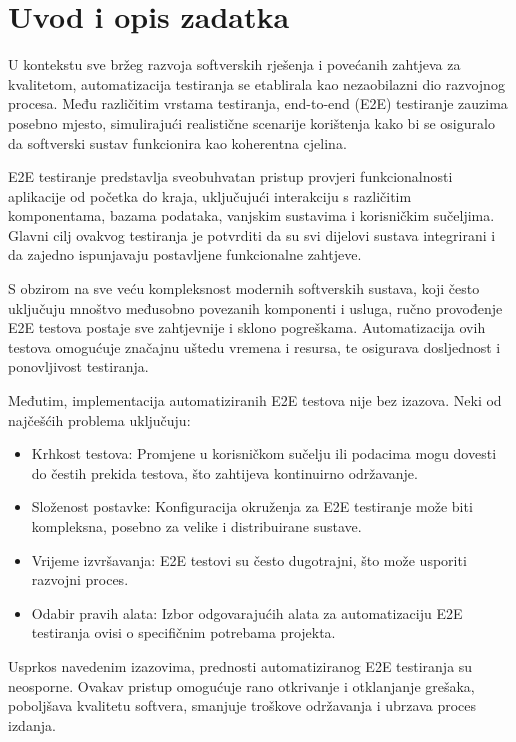 \chapter{Uvod i opis zadatka}\label{OpisIOgranicenja}
U kontekstu sve bržeg razvoja softverskih rješenja i povećanih zahtjeva za kvalitetom, automatizacija testiranja se etablirala kao nezaobilazni dio razvojnog procesa. Među različitim vrstama testiranja, end-to-end (E2E) testiranje zauzima posebno mjesto, simulirajući realistične scenarije korištenja kako bi se osiguralo da softverski sustav funkcionira kao koherentna cjelina.

E2E testiranje predstavlja sveobuhvatan pristup provjeri funkcionalnosti aplikacije od početka do kraja, uključujući interakciju s različitim komponentama, bazama podataka, vanjskim sustavima i korisničkim sučeljima. Glavni cilj ovakvog testiranja je potvrditi da su svi dijelovi sustava integrirani i da zajedno ispunjavaju postavljene funkcionalne zahtjeve.

S obzirom na sve veću kompleksnost modernih softverskih sustava, koji često uključuju mnoštvo međusobno povezanih komponenti i usluga, ručno provođenje E2E testova postaje sve zahtjevnije i sklono pogreškama. Automatizacija ovih testova omogućuje značajnu uštedu vremena i resursa, te osigurava dosljednost i ponovljivost testiranja.

Međutim, implementacija automatiziranih E2E testova nije bez izazova. Neki od najčešćih problema uključuju:
\begin{itemize}
    \item Krhkost testova: Promjene u korisničkom sučelju ili podacima mogu dovesti do čestih prekida testova, što zahtijeva kontinuirno održavanje.
    \item Složenost postavke: Konfiguracija okruženja za E2E testiranje može biti kompleksna, posebno za velike i distribuirane sustave.
    \item Vrijeme izvršavanja: E2E testovi su često dugotrajni, što može usporiti razvojni proces.
    \item Odabir pravih alata: Izbor odgovarajućih alata za automatizaciju E2E testiranja ovisi o specifičnim potrebama projekta.
\end{itemize}

Usprkos navedenim izazovima, prednosti automatiziranog E2E testiranja su neosporne.
Ovakav pristup omogućuje rano otkrivanje i otklanjanje grešaka, poboljšava kvalitetu softvera, smanjuje troškove održavanja i ubrzava proces izdanja.


